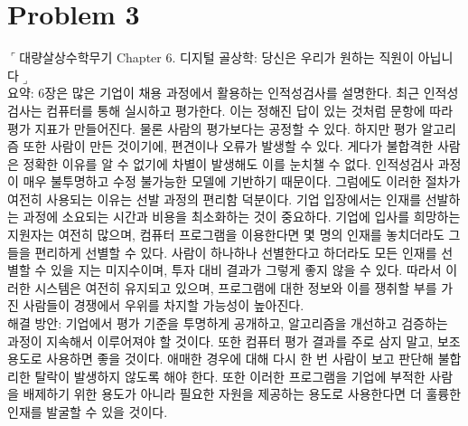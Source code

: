 \section*{Problem 3}
	$\ulcorner$대량살상수학무기 Chapter 6. 디지털 골상학: 당신은 우리가 원하는 직원이 아닙니다$\lrcorner$\\
	요약: 6장은 많은 기업이 채용 과정에서 활용하는 인적성검사를 설명한다. 최근 인적성검사는 컴퓨터를 통해 실시하고 평가한다. 이는 정해진 답이 있는 것처럼 문항에 따라 평가 지표가 만들어진다. 물론 사람의 평가보다는 공정할 수 있다. 하지만 평가 알고리즘 또한 사람이 만든 것이기에, 편견이나 오류가 발생할 수 있다. 게다가 불합격한 사람은 정확한 이유를 알 수 없기에 차별이 발생해도 이를 눈치챌 수 없다. 인적성검사 과정이 매우 불투명하고 수정 불가능한 모델에 기반하기 때문이다. 그럼에도 이러한 절차가 여전히 사용되는 이유는 선발 과정의 편리함 덕분이다. 기업 입장에서는 인재를 선발하는 과정에 소요되는 시간과 비용을 최소화하는 것이 중요하다. 기업에 입사를 희망하는 지원자는 여전히 많으며, 컴퓨터 프로그램을 이용한다면 몇 명의 인재를 놓치더라도 그들을 편리하게 선별할 수 있다. 사람이 하나하나 선별한다고 하더라도 모든 인재를 선별할 수 있을 지는 미지수이며, 투자 대비 결과가 그렇게 좋지 않을 수 있다. 따라서 이러한 시스템은 여전히 유지되고 있으며, 프로그램에 대한 정보와 이를 쟁취할 부를 가진 사람들이 경쟁에서 우위를 차지할 가능성이 높아진다.\\
	해결 방안: 기업에서 평가 기준을 투명하게 공개하고, 알고리즘을 개선하고 검증하는 과정이 지속해서 이루어져야 할 것이다. 또한 컴퓨터 평가 결과를 주로 삼지 말고, 보조 용도로 사용하면 좋을 것이다. 애매한 경우에 대해 다시 한 번 사람이 보고 판단해 불합리한 탈락이 발생하지 않도록 해야 한다. 또한 이러한 프로그램을 기업에 부적한 사람을 배제하기 위한 용도가 아니라 필요한 자원을 제공하는 용도로 사용한다면 더 훌륭한 인재를 발굴할 수 있을 것이다.